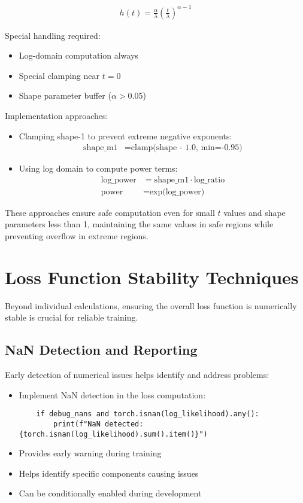 \begin{align}
    h(t) = \frac{\alpha}{\lambda}\left(\frac{t}{\lambda}\right)^{\alpha-1}
\end{align}

Special handling required:
\begin{itemize}
    \item Log-domain computation always
    \item Special clamping near $t=0$
    \item Shape parameter buffer ($\alpha > 0.05$)
\end{itemize}

Implementation approaches:
\begin{itemize}
    \item Clamping shape-1 to prevent extreme negative exponents:
    \begin{align}
        \text{shape\_m1} &= \text{clamp(shape - 1.0, min=-0.95)}
    \end{align}
    \item Using log domain to compute power terms:
    \begin{align}
        \text{log\_power} &= \text{shape\_m1} \cdot \text{log\_ratio} \\
        \text{power} &= \text{exp(log\_power)}
    \end{align}
\end{itemize}

These approaches ensure safe computation even for small $t$ values and shape parameters less than 1, maintaining the same values in safe regions while preventing overflow in extreme regions.

\section{Loss Function Stability Techniques}

Beyond individual calculations, ensuring the overall loss function is numerically stable is crucial for reliable training.

\subsection{NaN Detection and Reporting}

Early detection of numerical issues helps identify and address problems:

\begin{itemize}
    \item Implement NaN detection in the loss computation:
    \begin{verbatim}
    if debug_nans and torch.isnan(log_likelihood).any():
        print(f"NaN detected: {torch.isnan(log_likelihood).sum().item()}")
    \end{verbatim}
    \item Provides early warning during training
    \item Helps identify specific components causing issues
    \item Can be conditionally enabled during development
\end{itemize}

